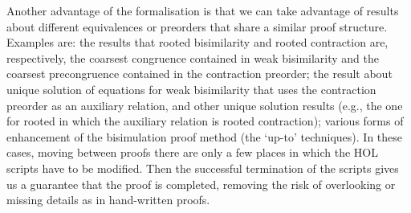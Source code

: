 
Another advantage of the formalisation is 
that we can take advantage of results about different 
equivalences or preorders that share a similar  proof structure. 
Examples are: the results that rooted bisimilarity and rooted contraction are,
respectively, the coarsest congruence contained in weak bisimilarity 
and the coarsest precongruence contained in the contraction  preorder; 
the result about unique solution of equations for weak bisimilarity that uses the
contraction preorder as an auxiliary relation, and other unique solution results (e.g., 
the one for rooted in which
the auxiliary relation is rooted contraction); various forms of enhancement of the bisimulation
proof method (the `up-to' techniques).  
In these cases,  moving between proofs there are only a few places in which the HOL scripts have to be modified.
Then the successful termination of the scripts  gives us a guarantee that the proof is
completed,  removing the risk 
of overlooking or missing details as in hand-written proofs.



